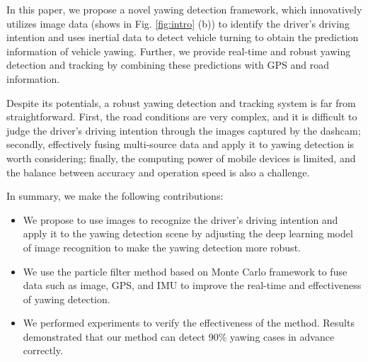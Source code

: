 \documentclass[journal]{IEEEtran}
\begin{document}
In this paper, we propose a novel yawing detection framework, which innovatively utilizes image data (shows in Fig. \ref{fig:intro} (b)) to identify the driver's driving intention and uses inertial data to detect vehicle turning to obtain the prediction information of vehicle yawing. Further, we provide real-time and robust yawing detection and tracking by combining these predictions with GPS and road information.\IEEEpubidadjcol

Despite its potentials, a robust yawing detection and tracking system is far from straightforward. First, the road conditions are very complex, and it is difficult to judge the driver's driving intention through the images captured by the dashcam; secondly, effectively fusing multi-source data and apply it to yawing detection is worth considering; finally, the computing power of mobile devices is limited, and the balance between accuracy and operation speed is also a challenge.

In summary, we make the following contributions:
\begin{itemize}
    \item We propose to use images to recognize the driver's driving intention and apply it to the yawing detection scene by adjusting the deep learning model of image recognition to make the yawing detection more robust.
    \item We use the particle filter method based on Monte Carlo framework to fuse data such as image, GPS, and IMU to improve the real-time and effectiveness of yawing detection.
    \item We performed experiments to verify the effectiveness of the method. Results demonstrated that our method can detect 90\% yawing cases in advance correctly.
\end{itemize}
\end{document}
